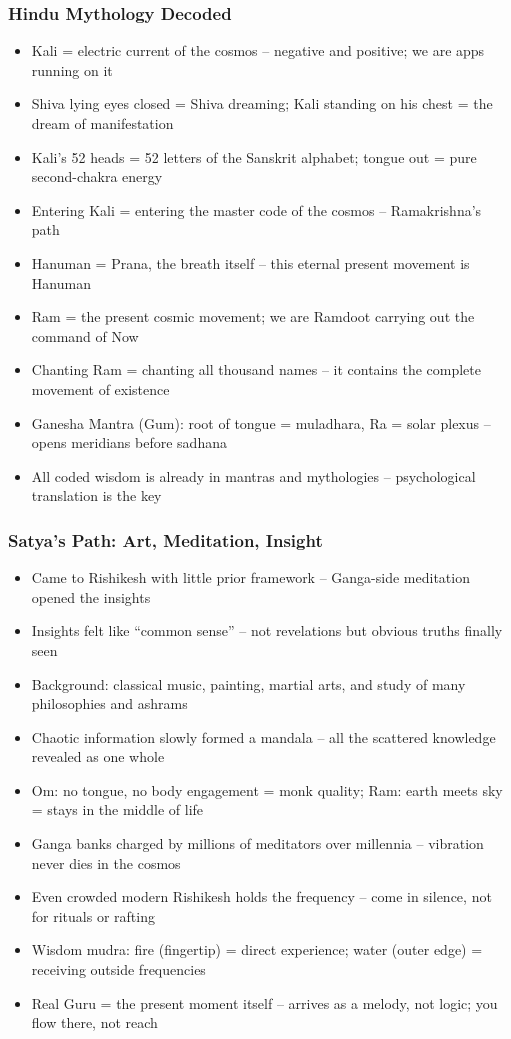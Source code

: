 \begin{frame}[fragile]\frametitle{Hindu Mythology Decoded}
  \begin{itemize}
    \item Kali = electric current of the cosmos -- negative and positive; we are apps running on it
    \item Shiva lying eyes closed = Shiva dreaming; Kali standing on his chest = the dream of manifestation
    \item Kali's 52 heads = 52 letters of the Sanskrit alphabet; tongue out = pure second-chakra energy
    \item Entering Kali = entering the master code of the cosmos -- Ramakrishna's path
    \item Hanuman = Prana, the breath itself -- this eternal present movement is Hanuman
    \item Ram = the present cosmic movement; we are Ramdoot carrying out the command of Now
    \item Chanting Ram = chanting all thousand names -- it contains the complete movement of existence
    \item Ganesha Mantra (Gum): root of tongue = muladhara, Ra = solar plexus -- opens meridians before sadhana
    \item All coded wisdom is already in mantras and mythologies -- psychological translation is the key
  \end{itemize}
\end{frame}

\begin{frame}[fragile]\frametitle{Satya's Path: Art, Meditation, Insight}
  \begin{itemize}
    \item Came to Rishikesh with little prior framework -- Ganga-side meditation opened the insights
    \item Insights felt like ``common sense'' -- not revelations but obvious truths finally seen
    \item Background: classical music, painting, martial arts, and study of many philosophies and ashrams
    \item Chaotic information slowly formed a mandala -- all the scattered knowledge revealed as one whole
    \item Om: no tongue, no body engagement = monk quality; Ram: earth meets sky = stays in the middle of life
    \item Ganga banks charged by millions of meditators over millennia -- vibration never dies in the cosmos
    \item Even crowded modern Rishikesh holds the frequency -- come in silence, not for rituals or rafting
    \item Wisdom mudra: fire (fingertip) = direct experience; water (outer edge) = receiving outside frequencies
    \item Real Guru = the present moment itself -- arrives as a melody, not logic; you flow there, not reach
  \end{itemize}
\end{frame}

